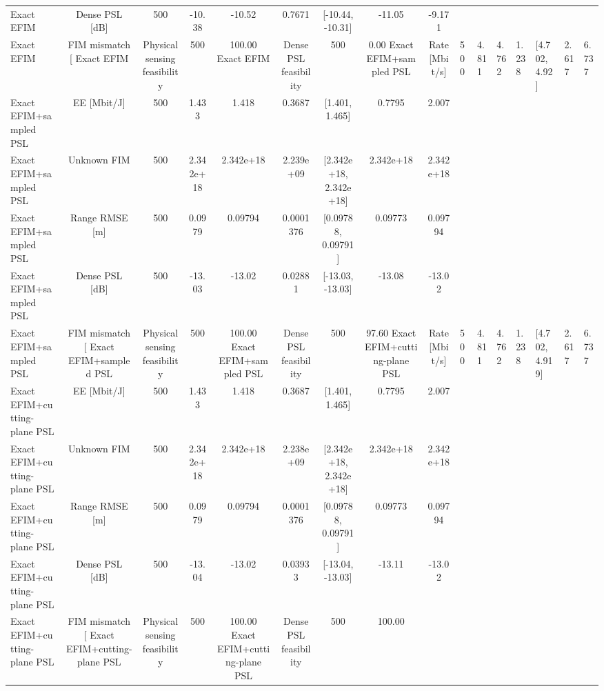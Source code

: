 \begin{table}[t]
\begin{tabular}{lcccccccc}
Exact EFIM & Dense PSL [dB] & 500 & -10.38 & -10.52 & 0.7671 & [-10.44, -10.31] & -11.05 & -9.171 \\
Exact EFIM & FIM mismatch [%
Exact EFIM & Physical sensing feasibility & 500 & 100.00%
Exact EFIM & Dense PSL feasibility & 500 & 0.00%
Exact EFIM+sampled PSL & Rate [Mbit/s] & 500 & 4.811 & 4.762 & 1.238 & [4.702, 4.92] & 2.617 & 6.737 \\
Exact EFIM+sampled PSL & EE [Mbit/J] & 500 & 1.433 & 1.418 & 0.3687 & [1.401, 1.465] & 0.7795 & 2.007 \\
Exact EFIM+sampled PSL & Unknown FIM & 500 & 2.342e+18 & 2.342e+18 & 2.239e+09 & [2.342e+18, 2.342e+18] & 2.342e+18 & 2.342e+18 \\
Exact EFIM+sampled PSL & Range RMSE [m] & 500 & 0.0979 & 0.09794 & 0.0001376 & [0.09788, 0.09791] & 0.09773 & 0.09794 \\
Exact EFIM+sampled PSL & Dense PSL [dB] & 500 & -13.03 & -13.02 & 0.02881 & [-13.03, -13.03] & -13.08 & -13.02 \\
Exact EFIM+sampled PSL & FIM mismatch [%
Exact EFIM+sampled PSL & Physical sensing feasibility & 500 & 100.00%
Exact EFIM+sampled PSL & Dense PSL feasibility & 500 & 97.60%
Exact EFIM+cutting-plane PSL & Rate [Mbit/s] & 500 & 4.811 & 4.762 & 1.238 & [4.702, 4.919] & 2.617 & 6.737 \\
Exact EFIM+cutting-plane PSL & EE [Mbit/J] & 500 & 1.433 & 1.418 & 0.3687 & [1.401, 1.465] & 0.7795 & 2.007 \\
Exact EFIM+cutting-plane PSL & Unknown FIM & 500 & 2.342e+18 & 2.342e+18 & 2.238e+09 & [2.342e+18, 2.342e+18] & 2.342e+18 & 2.342e+18 \\
Exact EFIM+cutting-plane PSL & Range RMSE [m] & 500 & 0.0979 & 0.09794 & 0.0001376 & [0.09788, 0.09791] & 0.09773 & 0.09794 \\
Exact EFIM+cutting-plane PSL & Dense PSL [dB] & 500 & -13.04 & -13.02 & 0.03933 & [-13.04, -13.03] & -13.11 & -13.02 \\
Exact EFIM+cutting-plane PSL & FIM mismatch [%
Exact EFIM+cutting-plane PSL & Physical sensing feasibility & 500 & 100.00%
Exact EFIM+cutting-plane PSL & Dense PSL feasibility & 500 & 100.00%
\hline
\end{tabular}
\end{table}

